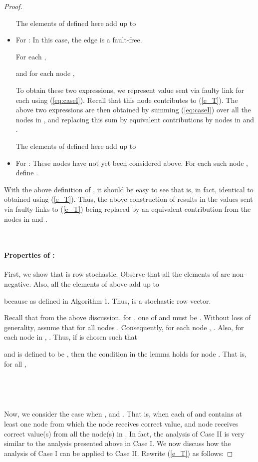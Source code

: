 \documentclass{llncs}
\begin{document}
\begin{proof}
\begin{itemize}
The elements of  defined here add up to 



\item For  : In this case, the edge  is a fault-free.

For each ,

and for each node ,

To obtain these two expressions, we represent value  sent via faulty link  for each  using (\ref{eq:caseI}).  
Recall that this node  contributes  to (\ref{e_T}).
The above two expressions are then obtained by summing (\ref{eq:caseI})
over all the nodes in , and replacing this sum
by equivalent contributions by nodes in  and .

The elements of  defined here add up to 



\item For  :
These nodes have not yet been considered above.
For each such node , define .
\end{itemize}
With the above definition of , it should be easy to see
that  is, in fact, identical to  obtained using (\ref{e_T}). Thus, the above construction of  results in the values sent via faulty links to (\ref{e_T}) being replaced by an equivalent contribution from the nodes in  and .

~

\paragraph{Properties of :}


First, we show that  is row stochastic. Observe that all
the elements of  are non-negative.
Also, all the elements of  above add up to

because  as defined in Algorithm 1.
Thus,  is a stochastic row vector.

Recall that from the above discussion, for ,
one of  and  must be .
Without loss of generality, assume that  for all nodes .
Consequently, for each node , . Also,
for each node  in ,
.
Thus, if  is chosen such that

and  is defined to be , then the condition in the
lemma holds for node . That is, 
for all , 






~



~

Now, we consider the case when , and . That is, when each of  and  contains at least one node from which the node  receives correct value, and node  receives correct value(s) from all the node(s) in . In fact, the analysis of Case II is very similar to the analysis presented above in Case I. We now discuss how the analysis of Case I can be applied to Case II. Rewrite (\ref{e_T}) as follows:




\end{proof}
\end{document}
